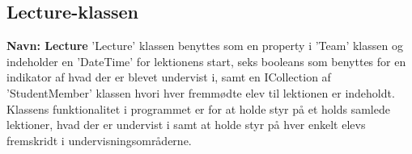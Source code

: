 \subsection*{Lecture-klassen}
\textbf{Navn: Lecture}
'Lecture' klassen benyttes som en property i 'Team' klassen og indeholder en 'DateTime' for lektionens start, seks booleans som benyttes for en indikator af hvad der er blevet undervist i, samt en ICollection af 'StudentMember' klassen hvori hver fremmødte elev til lektionen er indeholdt.
Klassens funktionalitet i programmet er for at holde styr på et holds samlede lektioner, hvad der er undervist i samt at holde styr på hver enkelt elevs fremskridt i undervisningsområderne.